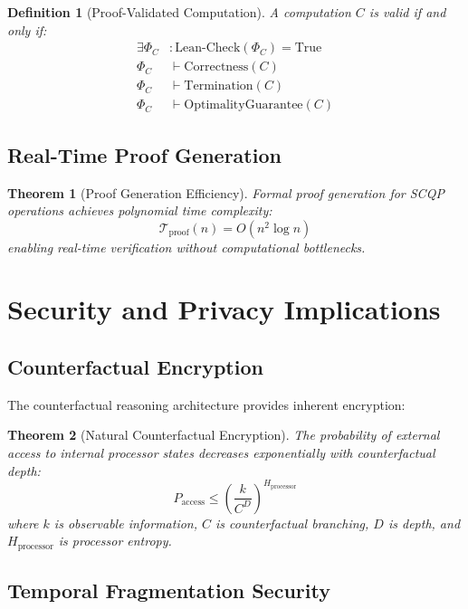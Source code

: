 \documentclass[12pt,a4paper]{article}
\newtheorem{theorem}{Theorem}
\newtheorem{definition}{Definition}
\begin{document}
\begin{definition}[Proof-Validated Computation]
A computation $C$ is valid if and only if:
\begin{align}
\exists \Phi_C &: \text{Lean-Check}(\Phi_C) = \text{True} \\
\Phi_C &\vdash \text{Correctness}(C) \\
\Phi_C &\vdash \text{Termination}(C) \\
\Phi_C &\vdash \text{OptimalityGuarantee}(C)
\end{align}
\end{definition}

\subsection{Real-Time Proof Generation}

\begin{theorem}[Proof Generation Efficiency]
Formal proof generation for SCQP operations achieves polynomial time complexity:
\begin{equation}
\mathcal{T}_{\text{proof}}(n) = O(n^2 \log n)
\end{equation}
enabling real-time verification without computational bottlenecks.
\end{theorem}

\section{Security and Privacy Implications}

\subsection{Counterfactual Encryption}

The counterfactual reasoning architecture provides inherent encryption:

\begin{theorem}[Natural Counterfactual Encryption]
The probability of external access to internal processor states decreases exponentially with counterfactual depth:
\begin{equation}
P_{\text{access}} \leq \left(\frac{k}{C^D}\right)^{H_{\text{processor}}}
\end{equation}
where $k$ is observable information, $C$ is counterfactual branching, $D$ is depth, and $H_{\text{processor}}$ is processor entropy.
\end{theorem}

\subsection{Temporal Fragmentation Security}
\end{document}
